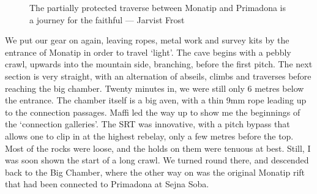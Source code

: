 \begin{figure}[t!]
\checkoddpage \ifoddpage \forcerectofloat \else \forceversofloat \fi
\centering
{}
\caption{The partially protected traverse between Monatip and Primadona is a journey for the faithful --- Jarvist Frost}
\label{traverse}
\end{figure}

We put our gear on again, leaving ropes, metal work and survey kits by the entrance of Monatip in order to travel ‘light’. The cave begins with a pebbly crawl, upwards into the mountain side, branching, before the first pitch. The next section is very straight, with an alternation of abseils, climbs and traverses before reaching the big chamber. Twenty minutes in, we were still only 6 metres below the entrance. The chamber itself is a big aven, with a thin 9mm rope leading up to the connection passages. Maffi led the way up to show me the beginnings of the ‘connection galleries’. The SRT was innovative, with a pitch bypass that allows one to clip in at the highest rebelay, only a few metres before the top. Most of the rocks were loose, and the holds on them were tenuous at best. Still, I was soon shown the start of a long crawl. We turned round there, and descended back to the Big Chamber, where the other way on was the original Monatip rift that had been connected to Primadona at Sejna Soba. 

